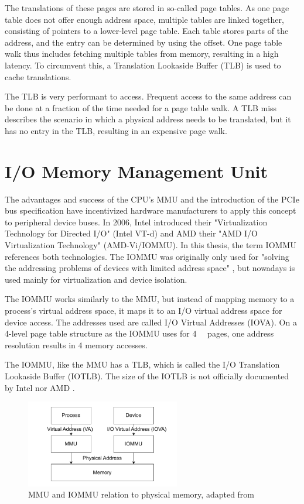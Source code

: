 The translations of these pages are stored in so-called page tables. As one page table does not offer enough address space, multiple tables are linked together, consisting of pointers to a lower-level page table. Each table stores parts of the address, and the entry can be determined by using the offset. One page table walk thus includes fetching multiple tables from memory, resulting in a high latency. To circumvent this, a Translation Lookaside Buffer (TLB) is used to cache translations.

The TLB is very performant to access. Frequent access to the same address can be done at a fraction of the time needed for a page table walk. A TLB miss describes the scenario in which a physical address needs to be translated, but it has no entry in the TLB, resulting in an expensive page walk.

\section{I/O Memory Management Unit}
The advantages and success of the CPU's MMU and the introduction of the PCIe bus specification have incentivized hardware manufacturers to apply this concept to peripheral device buses. In 2006, Intel introduced their "Virtualization Technology for Directed I/O" (Intel VT-d) and AMD their "AMD I/O Virtualization Technology" (AMD-Vi/IOMMU). In this thesis, the term IOMMU references both technologies. The IOMMU was originally only used for "solving the addressing problems of devices with limited address space" \cite{vfiokerneldocs}, but nowadays is used mainly for virtualization and device isolation.

The IOMMU works similarly to the MMU, but instead of mapping memory to a process's virtual address space, it maps it to an I/O virtual address space for device access. The addresses used are called I/O Virtual Addresses (IOVA).
On a 4-level page table structure as the IOMMU uses for \qty{4}{\kibi\byte} pages, one address resolution results in 4 memory accesses.

The IOMMU, like the MMU has a TLB, which is called the I/O Translation Lookaside Buffer (IOTLB). The size of the IOTLB is not officially documented by Intel nor AMD \cite{iommuhuber}.

\begin{figure}[H]
    \centering
    \includegraphics[width=0.6\textwidth]{figures/MMUIOMMU.pdf}
    \caption{MMU and IOMMU relation to physical memory, adapted from \cite{iommuscalability}}
    \label{fig:mmuvsiommu}
\end{figure}

